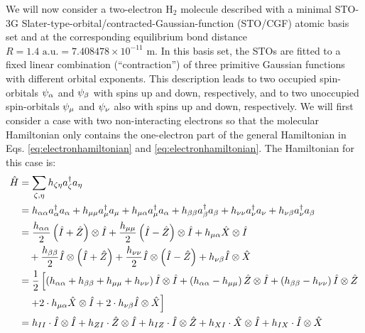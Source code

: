 \documentclass{aux/ttuthes2007}
\newcommand{\paren}[1]{\left( #1 \right)}
\newcommand{\anio}[1]{a_{\oo{#1}}}
\newcommand{\aniu}[1]{a_{\uo{#1}}}
\newcommand{\anig}[1]{a_{\go{#1}}}
\newcommand{\creo}[1]{a^\dagger_{\oo{#1}}}
\newcommand{\creu}[1]{a^\dagger_{\uo{#1}}}
\newcommand{\creg}[1]{a^\dagger_{\go{#1}}}
\newcommand{\uo}[1]{
		\IfEqCase{#1}{
			{0}{\mu}
			{1}{\nu}
			{2}{\xi}
		}[\PackageError{uo}{Undefined option to uo: #1}{}]
}
\newcommand{\oo}[1]{
		\IfEqCase{#1}{
			{0}{\alpha}
			{1}{\beta}
			{2}{\gamma}
		}[\PackageError{unocorb}{Undefined option to unuo: #1}{}]
}
\newcommand{\go}[1]{
		\IfEqCase{#1}{
			{0}{\zeta}
			{1}{\eta}
			{2}{\iota}
			{3}{\kappa}
		}[\PackageError{unocorb}{Undefined option to go: #1}{}]
}
\begin{document}
We will now consider a two-electron $\text{H}_2$ molecule described with a minimal STO-3G Slater-type-orbital/contracted-Gaussian-function (STO/CGF) atomic basis set  and at the corresponding equilibrium bond distance $R = 1.4 \text{ a.u.} = 7.408478 \times 10^{-11} \text{ m}.$
In this basis set, the STOs are fitted to a fixed linear combination (“contraction”) of three primitive Gaussian functions with different orbital exponents. 
This description leads to two occupied spin-orbitals $\psi_{\oo 0}$ and $\psi_{\oo 1}$ with spins up and down, respectively, and to two unoccupied spin-orbitals $\psi_{\uo 0}$ and $\psi_{\uo 1}$ also with spins up and down, respectively.
We will first consider a case with two non-interacting electrons so that the molecular Hamiltonian only contains the one-electron part of the general Hamiltonian in Eqs. \ref{eq:electronhamiltonian} and \ref{eq:electronhamiltonian}. The Hamiltonian for this case is:
%
\begin{equation*}
	\begin{split}
	\hat H  &= \sum_{\go 0, \go 1}h_{\go 0 \go 1}\creg 0 \anig 1 \\
		&= {h_{\alpha\alpha}} \creo 0 \anio 0
		+ {h_{\mu\mu}} \creu 0 \aniu 0
		+ h_{\mu\alpha} \creu 0 \anio 0 
		+ {h_{\beta\beta}} \creo 1 \anio 1
		+ {h_{\nu\nu}} \creu 1 \aniu 1
		+ h_{\nu\beta} \creu 1 \anio 1
%
		\\
%
		&= \frac{h_{\alpha\alpha}}{2} \paren{\hat I + \hat Z} \otimes \hat I
		+ \frac{h_{\mu\mu}}{2} \paren{\hat I - \hat Z} \otimes \hat I
		+ h_{\mu\alpha} \hat X \otimes \hat I 
%
		\\
%
		& \quad
		+ \frac{h_{\beta\beta}}{2} \hat I \otimes \paren{\hat I + \hat Z} 
		+ \frac{h_{\nu\nu}}{2} \hat I \otimes \paren{\hat I - \hat Z} 
		+ h_{\nu\beta} \hat I \otimes \hat X
%
	\\
%
		&= 	\frac{1}{2} \left[ 
			\paren{h_{\alpha\alpha} + h_{\beta\beta} + h_{\mu\mu} + h_{\nu\nu}} \hat I \otimes \hat I 
		+	\paren{h_{\alpha\alpha} - h_{\mu\mu}} \hat Z \otimes \hat I 
		+	\paren{h_{\beta\beta} - h_{\nu\nu}} \hat I \otimes \hat Z 
	\right .
	\\
		& \quad	\left .
		+ 	2 \cdot h_{\mu\alpha} \hat X \otimes \hat I 
		+ 	2 \cdot h_{\nu\beta} \hat I \otimes \hat X
	\right]
%
	\\
%
		&=	h_{II} \cdot \hat I \otimes \hat I
		+	h_{ZI} \cdot \hat Z \otimes \hat I
		+	h_{IZ} \cdot \hat I \otimes \hat Z
		+	h_{XI} \cdot \hat X \otimes \hat I
		+	h_{IX} \cdot \hat I \otimes \hat X
	\end{split}
\end{equation*}
\end{document}
